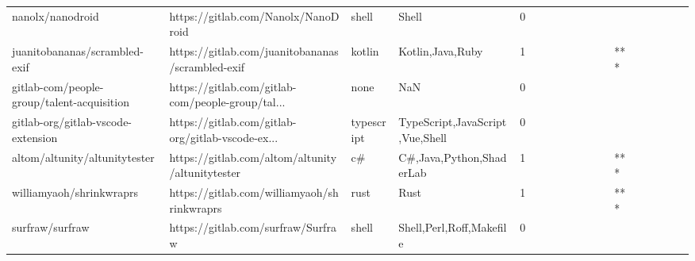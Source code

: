 \begin{tabular}{llllrlllllllllllll}
nanolx/nanodroid                                   &                https://gitlab.com/Nanolx/NanoDroid &             shell &                                              Shell &       0 &         &        &           &                &                 &        &           &           &          &          &       &              &          \\
juanitobananas/scrambled-exif                      &   https://gitlab.com/juanitobananas/scrambled-exif &            kotlin &                                   Kotlin,Java,Ruby &       1 &         &        &           &                &                 &        &           &       *** &          &          &       &              &          \\
gitlab-com/people-group/talent-acquisition         &  https://gitlab.com/gitlab-com/people-group/tal... &              none &                                                NaN &       0 &         &        &           &                &                 &        &           &           &          &          &       &              &          \\
gitlab-org/gitlab-vscode-extension                 &  https://gitlab.com/gitlab-org/gitlab-vscode-ex... &        typescript &                    TypeScript,JavaScript,Vue,Shell &       0 &         &        &           &                &                 &        &           &           &          &          &       &              &          \\
altom/altunity/altunitytester                      &   https://gitlab.com/altom/altunity/altunitytester &                c\# &                           C\#,Java,Python,ShaderLab &       1 &         &        &           &                &                 &        &           &       *** &          &          &       &              &          \\
williamyaoh/shrinkwraprs                           &        https://gitlab.com/williamyaoh/shrinkwraprs &              rust &                                               Rust &       1 &         &        &           &                &                 &        &           &       *** &          &          &       &              &          \\
surfraw/surfraw                                    &                 https://gitlab.com/surfraw/Surfraw &             shell &                           Shell,Perl,Roff,Makefile &       0 &         &        &           &                &                 &        &           &           &          &          &       &              &          \\

\end{tabular}
